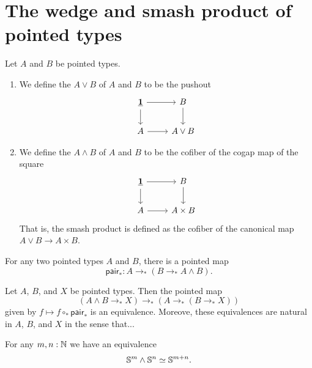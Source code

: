 \chapter{The wedge and smash product of pointed types}

\begin{defn}
Let $A$ and $B$ be pointed types.
\begin{enumerate}
\item We define the  $A\vee B$ of $A$ and $B$ to be the pushout
\begin{equation*}
\begin{tikzcd}
\unit \arrow[r] \arrow[d] & B \arrow[d] \\
A \arrow[r] & A\vee B
\end{tikzcd}
\end{equation*}
\item We define the  $A\wedge B$ of $A$ and $B$ to be the cofiber of the cogap map of the square
\begin{equation*}
\begin{tikzcd}
\unit \arrow[r] \arrow[d] & B \arrow[d] \\
A \arrow[r] & A\times B
\end{tikzcd}
\end{equation*}
That is, the smash product is defined as the cofiber of the canonical map $A\vee B\to A\times B$. 
\end{enumerate}
\end{defn}

For any two pointed types $A$ and $B$, there is a pointed map
\begin{equation*}
\mathsf{pair}_\ast : A \to_\ast (B\to_\ast A\wedge B).
\end{equation*}

\begin{thm}\label{thm:smash_adj}
Let $A$, $B$, and $X$ be pointed types. Then the pointed map
\begin{equation*}
(A\wedge B \to_\ast X)\to_\ast (A \to_\ast (B\to_\ast X))
\end{equation*}
given by $f\mapsto f\mathbin{\circ_\ast}\mathsf{pair}_\ast$ is an equivalence.
Moreove, these equivalences are natural in $A$, $B$, and $X$ in the sense that...
\end{thm}

\begin{cor}
For any $m,n:\mathbb{N}$ we have an equivalence
\begin{equation*}
\eqv{{\sphere{m}}\wedge{\sphere{n}}}{\sphere{m+n}}.
\end{equation*}
\end{cor}

